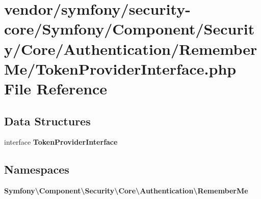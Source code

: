 \section{vendor/symfony/security-\/core/\+Symfony/\+Component/\+Security/\+Core/\+Authentication/\+Remember\+Me/\+Token\+Provider\+Interface.php File Reference}
\label{_token_provider_interface_8php}
\subsection*{Data Structures}
\begin{DoxyCompactItemize}
\item 
interface {\bf Token\+Provider\+Interface}
\end{DoxyCompactItemize}
\subsection*{Namespaces}
\begin{DoxyCompactItemize}
\item 
 {\bf Symfony\textbackslash{}\+Component\textbackslash{}\+Security\textbackslash{}\+Core\textbackslash{}\+Authentication\textbackslash{}\+Remember\+Me}
\end{DoxyCompactItemize}
